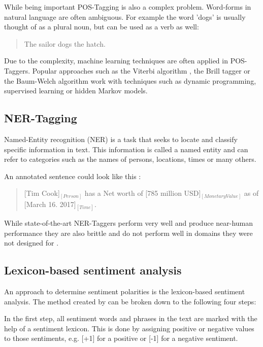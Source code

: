 \documentclass[10pt,a4paper]{article}
\begin{document}
		While being important POS-Tagging is also a complex problem. Word-forms in natural language are often ambiguous. For example the word 'dogs' is usually thought of as a plural noun, but can be used as a verb as well:

		\begin{quote}
			The sailor dogs the hatch.
		\end{quote}

		Due to the complexity, machine learning techniques are often applied in POS-Taggers. Popular approaches such as the Viterbi algorithm \cite{Viterbi:2006:EBC:2263262.2267502}, the Brill tagger \cite{Brill:1992:SRP:974499.974526} or the Baum-Welch algorithm \cite{baumwelch} work with techniques such as dynamic programming, supervised learning or hidden Markov models.

		\subsection{NER-Tagging}
		Named-Entity recognition (NER) is a task that seeks to locate and classify specific information in text. This information is called a named entity and can refer to categories such as the names of persons, locations, times or many others.

		An annotated sentence could look like this :

		\begin{quote}
			[Tim Cook]$_{[Person]}$ has a Net worth of [785 million USD]$_{[Monetary Value]}$ as of [March 16. 2017]$_{[Time]}$.
		\end{quote}
		
		While state-of-the-art NER-Taggers perform very well and produce near-human performance they are also brittle and do not perform well in domains they were not designed for \cite{ner}.
		
		\subsection{Lexicon-based sentiment analysis}
		An approach to determine sentiment polarities is the lexicon-based sentiment analysis. The method created by \cite{Ding:2008:HLA:1341531.1341561} can be broken down to the following four steps: 
		
		In the first step, all sentiment words and phrases in the text are marked with the help of a sentiment lexicon. This is done by assigning positive or negative values to those sentiments, e.g. [+1] for a positive or [-1] for a negative sentiment.
		
\end{document}
